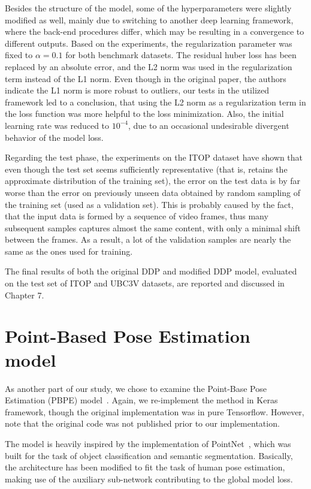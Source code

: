 \noindent Besides the structure of the model, some of the hyperparameters were slightly modified as well, mainly due to switching to another deep learning framework, where the back-end procedures differ, which may be resulting in a convergence to different outputs. Based on the experiments, the regularization parameter was fixed to $\alpha = 0.1$ for both benchmark datasets. The residual huber loss has been replaced by an absolute error, and the L2 norm was used in the regularization term instead of the L1 norm. Even though in the original paper, the authors indicate the L1 norm is more robust to outliers, our tests in the utilized framework led to a conclusion, that using the L2 norm as a regularization term in the loss function was more helpful to the loss minimization. Also, the initial learning rate was reduced to $10^{-4}$, due to an occasional undesirable divergent behavior of the model loss.\par
\vspace{5mm}
\noindent Regarding the test phase, the experiments on the ITOP dataset have shown that even though the test set seems sufficiently representative (that is, retains the approximate distribution of the training set), the error on the test data is by far worse than the error on previously unseen data obtained by random sampling of the training set (used as a validation set). This is probably caused by the fact, that the input data is formed by a sequence of video frames, thus many subsequent samples captures almost the same content, with only a minimal shift between the frames. As a result, a lot of the validation samples are nearly the same as the ones used for training.\par
\vspace{5mm}
\noindent
The final results of both the original DDP and modified DDP model, evaluated on the test set of ITOP and UBC3V datasets, are reported and discussed in Chapter 7.


\section{Point-Based Pose Estimation model}

As another part of our study, we chose to examine the Point-Base Pose Estimation (PBPE) model~\cite{Ali19}. Again, we re-implement the method in Keras framework, though the original implementation was in pure Tensorflow. However, note that the original code was not published prior to our implementation.\par
\vspace{5mm}
\noindent %
The model is heavily inspired by the implementation of PointNet~\cite{DBLP:journals/corr/QiSMG16}, which was built for the task of object classification and semantic segmentation. Basically, the architecture has been modified to fit the task of human pose estimation, making use of the auxiliary sub-network contributing to the global model loss.


